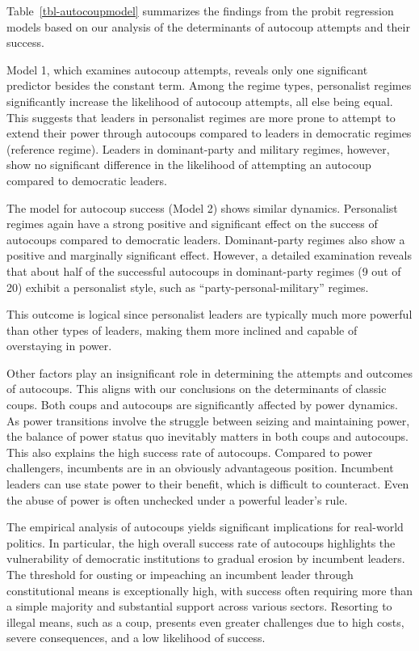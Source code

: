 \documentclass[
  12pt,
]{report}
\begin{document}
Table~\ref{tbl-autocoupmodel} summarizes the findings from the probit
regression models based on our analysis of the determinants of autocoup
attempts and their success.

Model 1, which examines autocoup attempts, reveals only one significant
predictor besides the constant term. Among the regime types, personalist
regimes significantly increase the likelihood of autocoup attempts, all
else being equal. This suggests that leaders in personalist regimes are
more prone to attempt to extend their power through autocoups compared
to leaders in democratic regimes (reference regime). Leaders in
dominant-party and military regimes, however, show no significant
difference in the likelihood of attempting an autocoup compared to
democratic leaders.

The model for autocoup success (Model 2) shows similar dynamics.
Personalist regimes again have a strong positive and significant effect
on the success of autocoups compared to democratic leaders.
Dominant-party regimes also show a positive and marginally significant
effect. However, a detailed examination reveals that about half of the
successful autocoups in dominant-party regimes (9 out of 20) exhibit a
personalist style, such as ``party-personal-military'' regimes.

This outcome is logical since personalist leaders are typically much
more powerful than other types of leaders, making them more inclined and
capable of overstaying in power.

Other factors play an insignificant role in determining the attempts and
outcomes of autocoups. This aligns with our conclusions on the
determinants of classic coups. Both coups and autocoups are
significantly affected by power dynamics. As power transitions involve
the struggle between seizing and maintaining power, the balance of power
status quo inevitably matters in both coups and autocoups. This also
explains the high success rate of autocoups. Compared to power
challengers, incumbents are in an obviously advantageous position.
Incumbent leaders can use state power to their benefit, which is
difficult to counteract. Even the abuse of power is often unchecked
under a powerful leader's rule.

The empirical analysis of autocoups yields significant implications for
real-world politics. In particular, the high overall success rate of
autocoups highlights the vulnerability of democratic institutions to
gradual erosion by incumbent leaders. The threshold for ousting or
impeaching an incumbent leader through constitutional means is
exceptionally high, with success often requiring more than a simple
majority and substantial support across various sectors. Resorting to
illegal means, such as a coup, presents even greater challenges due to
high costs, severe consequences, and a low likelihood of success.
\end{document}

